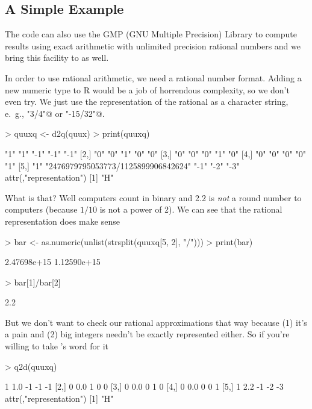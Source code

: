 \documentclass{article}
\begin{document}
\subsection{A Simple Example}

The \verb@cddlib@ code can also use the GMP (GNU Multiple Precision) Library
to compute results using exact arithmetic with unlimited precision rational
numbers and we bring this facility to \verb@rcdd@ as well.

In order to use rational arithmetic, we need a rational number format.
Adding a new numeric type to R would be a job of horrendous complexity,
so we don't even try.  We just use the representation of the rational
as a character string, e.~g., \verb@"3/4"@ or \verb@"-15/32"@.
\begin{Schunk}
\begin{Sinput}
> quuxq <- d2q(quux)
> print(quuxq)
\end{Sinput}
\begin{Soutput}
     [,1] [,2]                                [,3] [,4] [,5]
[1,] "1"  "1"                                 "-1" "-1" "-1"
[2,] "0"  "0"                                 "1"  "0"  "0" 
[3,] "0"  "0"                                 "0"  "1"  "0" 
[4,] "0"  "0"                                 "0"  "0"  "1" 
[5,] "1"  "2476979795053773/1125899906842624" "-1" "-2" "-3"
attr(,"representation")
[1] "H"
\end{Soutput}
\end{Schunk}
What is that?  Well computers count in binary and 2.2 is
\emph{not} a round number to computers (because $1/10$ is not a power of 2).
We can see that the rational representation does make sense
\begin{Schunk}
\begin{Sinput}
> bar <- as.numeric(unlist(strsplit(quuxq[5, 2], "/")))
> print(bar)
\end{Sinput}
\begin{Soutput}
[1] 2.47698e+15 1.12590e+15
\end{Soutput}
\begin{Sinput}
> bar[1]/bar[2]
\end{Sinput}
\begin{Soutput}
[1] 2.2
\end{Soutput}
\end{Schunk}
But we don't want to check our rational approximations that way
because (1) it's a pain and (2) big integers needn't be
exactly represented either.  So if you're willing to take
\verb@rcdd@'s word for it
\begin{Schunk}
\begin{Sinput}
> q2d(quuxq)
\end{Sinput}
\begin{Soutput}
     [,1] [,2] [,3] [,4] [,5]
[1,]    1  1.0   -1   -1   -1
[2,]    0  0.0    1    0    0
[3,]    0  0.0    0    1    0
[4,]    0  0.0    0    0    1
[5,]    1  2.2   -1   -2   -3
attr(,"representation")
[1] "H"
\end{Soutput}
\end{Schunk}
\end{document}
